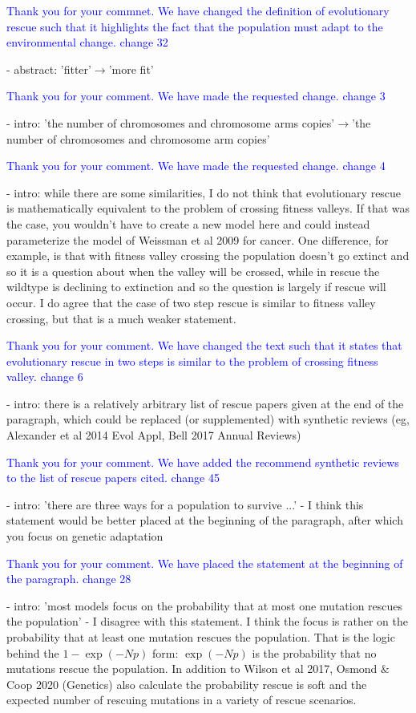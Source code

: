 \documentclass[11pt,a4paper]{article}
\begin{document}
\textcolor{blue}{Thank you for your commnet. We have changed the definition of evolutionary rescue such that it highlights the fact that the population must adapt to the environmental change. change 32} 

- abstract: 'fitter'$\rightarrow$'more fit'

\textcolor{blue}{Thank you for your comment. We have made the requested change. change 3} 

- intro: 'the number of chromosomes and chromosome arms copies'$\rightarrow$'the number of chromosomes and chromosome arm copies'

\textcolor{blue}{Thank you for your comment. We have made the requested change. change 4} 

- intro: while there are some similarities, I do not think that evolutionary rescue is mathematically equivalent to the problem of crossing fitness valleys. If that was the case, you wouldn't have to create a new model here and could instead parameterize the model of Weissman et al 2009 for cancer. One difference, for example, is that with fitness valley crossing the population doesn't go extinct and so it is a question about when the valley will be crossed, while in rescue the wildtype is declining to extinction and so the question is largely if rescue will occur. I do agree that the case of two step rescue is similar to fitness valley crossing, but that is a much weaker statement.

\textcolor{blue}{Thank you for your comment. We have changed the text such that it states that evolutionary rescue in two steps is similar to the problem of crossing fitness valley. change 6} 

- intro: there is a relatively arbitrary list of rescue papers given at the end of the paragraph, which could be replaced (or supplemented) with synthetic reviews (eg, Alexander et al 2014 Evol Appl, Bell 2017 Annual Reviews)

\textcolor{blue}{Thank you for your comment. We have added the recommend synthetic reviews to the list of rescue papers cited. change 45} 

- intro: 'there are three ways for a population to survive ...' - I think this statement would be better placed at the beginning of the paragraph, after which you focus on genetic adaptation

\textcolor{blue}{Thank you for your comment. We have  placed the statement at the beginning of the paragraph. change 28} 

- intro: 'most models focus on the probability that at most one mutation rescues the population' - I disagree with this statement. I think the focus is rather on the probability that at least one mutation rescues the population. That is the logic behind the $1-\exp(-Np)$ form: $\exp(-Np)$ is the probability that no mutations rescue the population. In addition to Wilson et al 2017, Osmond $\&$ Coop 2020 (Genetics) also calculate the probability rescue is soft and the expected number of rescuing mutations in a variety of rescue scenarios.
\end{document}
